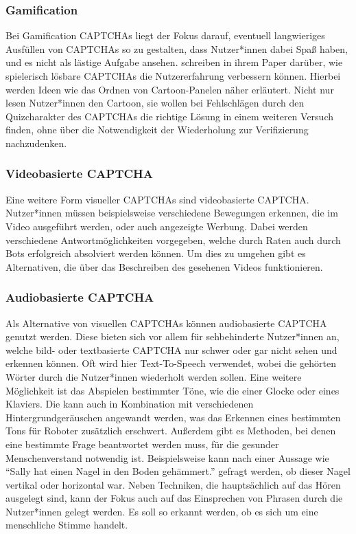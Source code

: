 \subsubsection*{Gamification}
Bei Gamification CAPTCHAs liegt der Fokus darauf, eventuell langwieriges Ausfüllen von CAPTCHAs so zu gestalten, dass Nutzer*innen dabei Spaß haben,
und es nicht als lästige Aufgabe ansehen.
\citeauthor{gamified} schreiben in ihrem Paper  darüber, wie spielerisch lösbare CAPTCHAs die Nutzererfahrung verbessern können.
Hierbei werden Ideen wie das Ordnen von Cartoon-Panelen näher erläutert.
Nicht nur lesen Nutzer*innen den Cartoon, sie wollen bei Fehlschlägen durch den Quizcharakter des CAPTCHAs die richtige Lösung in einem weiteren Versuch finden,
ohne über die Notwendigkeit der Wiederholung zur Verifizierung nachzudenken. \cite[p.41ff]{gamified}


\subsubsection*{Videobasierte CAPTCHA}
Eine weitere Form visueller CAPTCHAs sind videobasierte CAPTCHA. 
Nutzer*innen müssen beispielsweise verschiedene Bewegungen erkennen, die im Video ausgeführt werden,
oder auch angezeigte Werbung.
Dabei werden verschiedene Antwortmöglichkeiten vorgegeben, welche durch Raten auch durch Bots erfolgreich absolviert werden können.
Um dies zu umgehen gibt es Alternativen, die über das Beschreiben des gesehenen Videos funktionieren. \cite[p.xx]{surveyofresearch} 

\subsubsection*{Audiobasierte CAPTCHA}
Als Alternative von visuellen CAPTCHAs können audiobasierte CAPTCHA genutzt werden.
Diese bieten sich vor allem für sehbehinderte Nutzer*innen an, welche bild- oder textbasierte CAPTCHA nur schwer oder gar nicht sehen und erkennen können.
Oft wird hier Text-To-Speech verwendet, wobei die gehörten Wörter durch die Nutzer*innen wiederholt werden sollen.
Eine weitere Möglichkeit ist das Abspielen bestimmter Töne, wie die einer Glocke oder eines Klaviers. 
Die kann auch in Kombination mit verschiedenen Hintergrundgeräuschen angewandt werden, was das Erkennen eines bestimmten Tons für Roboter zusätzlich erschwert.
Außerdem gibt es Methoden, bei denen eine bestimmte Frage beantwortet werden muss, für die gesunder Menschenverstand notwendig ist. 
Beispielsweise kann nach einer Aussage wie ``Sally hat einen Nagel in den Boden gehämmert.'' gefragt werden, ob dieser Nagel vertikal oder horizontal war. \cite[p.3]{commonsense}
Neben Techniken, die hauptsächlich auf das Hören ausgelegt sind, kann der Fokus auch auf das Einsprechen von Phrasen durch die Nutzer*innen gelegt werden.
Es soll so erkannt werden, ob es sich um eine menschliche Stimme handelt.
\cite[p.78]{surveyofresearch}

